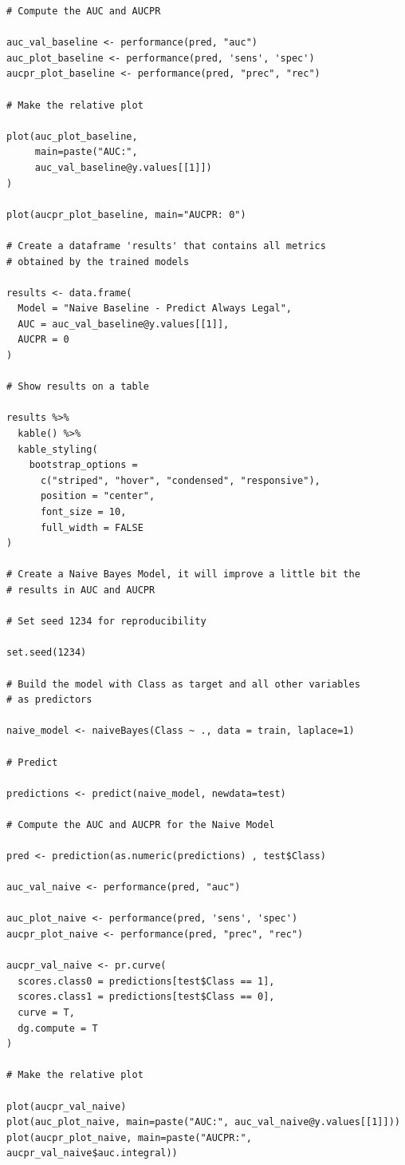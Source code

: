 \documentclass[]{article}
\begin{document}
\begin{verbatim}
# Compute the AUC and AUCPR

auc_val_baseline <- performance(pred, "auc")
auc_plot_baseline <- performance(pred, 'sens', 'spec')
aucpr_plot_baseline <- performance(pred, "prec", "rec")

# Make the relative plot

plot(auc_plot_baseline, 
     main=paste("AUC:", 
     auc_val_baseline@y.values[[1]])
)

plot(aucpr_plot_baseline, main="AUCPR: 0")

# Create a dataframe 'results' that contains all metrics 
# obtained by the trained models

results <- data.frame(
  Model = "Naive Baseline - Predict Always Legal", 
  AUC = auc_val_baseline@y.values[[1]],
  AUCPR = 0
)

# Show results on a table

results %>% 
  kable() %>%
  kable_styling(
    bootstrap_options = 
      c("striped", "hover", "condensed", "responsive"),
      position = "center",
      font_size = 10,
      full_width = FALSE
) 
 
# Create a Naive Bayes Model, it will improve a little bit the 
# results in AUC and AUCPR

# Set seed 1234 for reproducibility

set.seed(1234)

# Build the model with Class as target and all other variables
# as predictors

naive_model <- naiveBayes(Class ~ ., data = train, laplace=1)

# Predict

predictions <- predict(naive_model, newdata=test)

# Compute the AUC and AUCPR for the Naive Model

pred <- prediction(as.numeric(predictions) , test$Class)

auc_val_naive <- performance(pred, "auc")

auc_plot_naive <- performance(pred, 'sens', 'spec')
aucpr_plot_naive <- performance(pred, "prec", "rec")

aucpr_val_naive <- pr.curve(
  scores.class0 = predictions[test$Class == 1], 
  scores.class1 = predictions[test$Class == 0],
  curve = T,  
  dg.compute = T
)

# Make the relative plot

plot(aucpr_val_naive)
plot(auc_plot_naive, main=paste("AUC:", auc_val_naive@y.values[[1]]))
plot(aucpr_plot_naive, main=paste("AUCPR:", aucpr_val_naive$auc.integral))


\end{verbatim}
\end{document}
